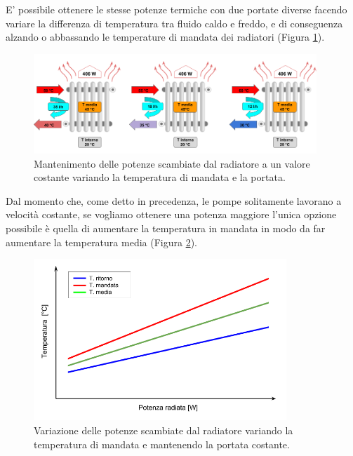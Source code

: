 \documentclass[laurea,oneside,11pt]{USiena_tesiLM3}
\begin{document}
E' possibile ottenere  le stesse potenze termiche con due portate diverse facendo variare la differenza di temperatura tra fluido caldo e freddo, e di conseguenza alzando o abbassando le temperature di mandata dei radiatori (Figura \ref{fig:portata}). 

\begin{figure}[h]
\begin{center}
\includegraphics[width=0.95\textwidth]{figure/portata} %
\caption{Mantenimento delle potenze scambiate dal radiatore a un valore costante variando la temperatura di mandata e la portata.}
\label{fig:portata}
\end{center}
\end{figure}

Dal momento che, come detto in precedenza, le pompe solitamente lavorano a velocità costante, se vogliamo ottenere una potenza maggiore l'unica opzione possibile è quella di aumentare la temperatura in mandata in modo da far aumentare la temperatura media (Figura \ref{fig:portata2}).

\begin{figure}[!ht]
\begin{center}
\includegraphics[width=0.85\textwidth]{figure/pot_radiatore} %
\caption{Variazione delle potenze scambiate dal radiatore variando la temperatura di mandata e mantenendo la portata costante.}
\label{fig:portata2}
\end{center}
\end{figure}
\end{document}
